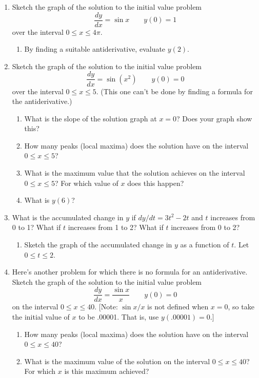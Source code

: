 \begin{enumerate}
\item Sketch the graph of the solution to the initial value problem
        \[
\dfrac{dy}{dx} = \sin{x} \qquad y(0) = 1
\]
over the interval $0 \leq x \leq 4\pi$.

  \begin{enumerate}
  \item By finding a suitable antiderivative, evaluate $y(2)$.


\end{enumerate}
\item Sketch the graph of the solution to the initial value problem
        \[
\dfrac{dy}{dx} = \sin(x^2) \qquad y(0) = 0
\] 
over the interval $0 \leq x \leq 5$.  (This one can't be done by
finding a formula for the antiderivative.)


  \begin{enumerate}
  \item What is the slope of the solution graph at $x = 0$?  Does your graph show this?

  \item How many peaks (local maxima) does the solution have on the interval $0 \leq x \leq 5$?

  \item What is the maximum value that the solution achieves on the interval $0 \leq x \leq 5$?  For which value of $x$ does this happen?

  \item What is $y(6)$?



\end{enumerate}
\item What is the accumulated change in $y$ if $dy/dt = 3t^2 - 2t$ and $t$ increases from 0 to 1?  What if $t$ increases from 1 to 2?  What if $t$ increases from 0 to 2?

  \begin{enumerate}
  \item Sketch the graph of the accumulated change in $y$ as a function of $t$.  Let $0 \leq t \leq 2$.



\end{enumerate}
\item Here's another problem for which there is no formula for an antiderivative. Sketch the graph of the solution to the initial value problem
        \[
\dfrac{dy}{dx} = \dfrac{\sin{x}}{x} \qquad y(0) = 0
\]
on the interval $0 \leq x \leq 40$.  [Note: $\sin{x}/x$ is not defined when $x = 0$, so take the initial value of $x$ to be .00001.  That is, use $y(.00001) = 0$.]


  \begin{enumerate}
  \item How many peaks (local maxima) does the solution have on the interval $0 \leq x \leq 40$?

  \item What is the maximum value of the solution on the interval $0 \leq x \leq 40$?  For which $x$ is this maximum achieved?






\end{enumerate}
\end{enumerate}
